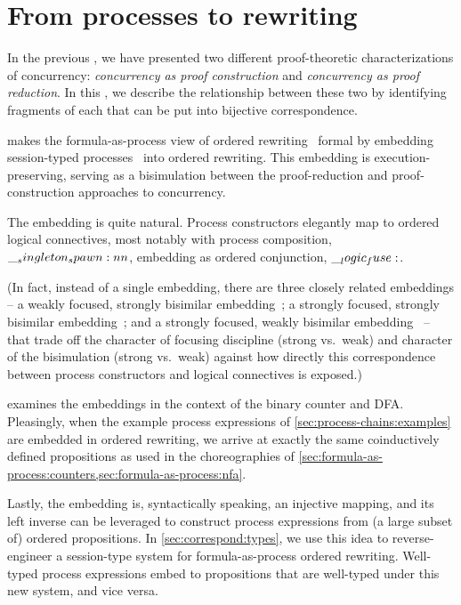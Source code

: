 \chapter{From processes to rewriting}\label{ch:correspond}

In the previous , we have presented two different proof-theoretic characterizations of concurrency: \emph{concurrency as proof construction} and \emph{concurrency as proof reduction}.
In this , we describe the relationship between these two by identifying fragments of each that can be put into bijective correspondence.

 makes the formula-as-process view of ordered rewriting~ formal by embedding session-typed processes~ into ordered rewriting.
This embedding is execution-preserving, serving as a bisimulation between the proof-reduction and proof-construction approaches to concurrency.

The embedding is quite natural.
Process constructors elegantly map to ordered logical connectives, most notably with process composition, $\__singleton_spawn:nn {} {}$, embedding as ordered conjunction, $\__logic_fuse:$.

(In fact, instead of a single embedding, there are three closely related embeddings -- a weakly focused, strongly bisimilar embedding~; a strongly focused, strongly bisimilar embedding~; and a strongly focused, weakly bisimilar embedding~ -- that trade off the character of focusing discipline (strong vs.\ weak) and character of the bisimulation (strong vs.\ weak) against how directly this correspondence between process constructors and logical connectives is exposed.)

 examines the embeddings in the context of the binary counter and \ac{DFA}.
Pleasingly, when the example process expressions of \cref{sec:process-chains:examples} are embedded in ordered rewriting, we arrive at exactly the same coinductively defined propositions as used in the choreographies of \cref{sec:formula-as-process:counters,sec:formula-as-process:nfa}.

Lastly, the embedding is, syntactically speaking, an injective mapping, and its left inverse can be leveraged to construct process expressions from (a large subset of) ordered propositions.
In \cref{sec:correspond:types}, we use this idea to reverse-engineer a session-type system for formula-as-process ordered rewriting.
Well-typed process expressions embed to propositions that are well-typed under this new system, and vice versa.
     

